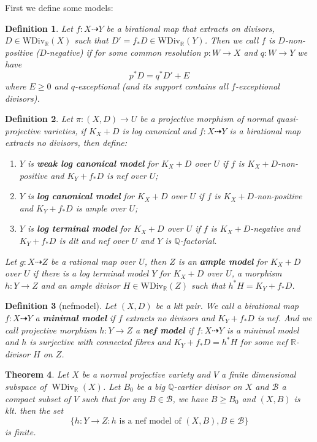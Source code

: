 \documentclass{article}
\newtheorem{defn}{Definition}[section]
\newtheorem{thm}[defn]{Theorem}
\begin{document}
First we define some models:
\begin{defn}
	Let $ f:X\dashrightarrow Y$ be a birational map that extracts on divisors, $ D\in \mathrm{WDiv}_\mathbb{R}(X) $ such that $ D'=f_*D\in \mathrm{WDiv}_\mathbb{R}(Y) $. Then we call $ f $ is $ D $-non-positive ($ D $-negative) if for some common resolution $ p:W\to X $ and $ q:W\to Y $ we have
	$$ p^*D=q^*D'+E $$
	where $ E\geqslant 0 $ and $ q $-exceptional (and its support contains all $ f $-exceptional divisors). 
\end{defn}

\begin{defn}
		Let $ \pi:(X,D)\to U $ be a projective morphism of normal quasi-projective varieties, if $ K_X+D $ is log canonical and $ f:X\dashrightarrow Y $ is a birational map extracts no divisors, then define:
		\begin{enumerate}
			\item $ Y $ is \textbf{ weak log canonical model} for $ K_X+D $ over $ U $ if $ f $ is $ K_X+D $-non-positive and $ K_Y+f_*D $ is nef over $ U $;
			\item $ Y $ is \textbf{ log canonical model} for $ K_X+D $ over $ U $ if $ f $ is $ K_X+D $-non-positive and $ K_Y+f_*D $ is ample over $ U $;
			\item $ Y $ is \textbf{ log terminal model} for $ K_X+D $ over $ U $ if $ f $ is $ K_X+D $-negative and $ K_Y+f_*D $ is dlt and nef over $ U $ and $ Y $ is $ \mathbb{Q} $-factorial.
		\end{enumerate}
	Let $ g:X\dashrightarrow Z $ be a rational map over $ U $, then $ Z $ is an \textbf{ample model } for $ K_X+D $ over $ U $ if there is a log terminal model $ Y $ for $ K_X+D $ over $ U $, a morphism $ h:Y\to Z $ and an ample divisor $ H\in \mathrm{WDiv}_\mathbb{R}(Z) $ such that $ h^*H=K_Y+f_*D $. 
\end{defn}

\begin{defn}[nefmodel]\label{nefmodel}
  Let $ (X,D) $ be a klt pair. We call a birational map $f:X\dashrightarrow Y $ a \textbf{minimal model} if $f$ extracts no divisors and $K_{Y}+f_*D$ is nef. And we call  projective morphism  $  h:Y\to Z $ a \textbf{nef model} if $ f:X\dashrightarrow Y $ is a minimal model and $ h $ is surjective with connected fibres and $ K_Y+f_*D=h^*H $ for some nef $ \mathbb{R} $-divisor $ H $ on $ Z $.
\end{defn}
\begin{thm}\label{finitenefmodel}
  Let $ X $ be a normal projective variety and $ V $ a finite dimensional subspace of $ \operatorname{WDiv}_\mathbb{R}(X) $. Let $ B_0 $ be a big $ \mathbb{Q}$-cartier divisor on $ X $ and $ \mathcal{B} $ a compact subset of $ V $ such that for any $ B\in \mathcal{B} $, we have $ B\geqslant B_0 $ and $ (X,B) $ is klt. then the set
  \[ \{h:Y\to Z:  h \text{ is a nef model of } (X,B), B\in\mathcal{B} \} \]
  is finite.
\end{thm}
\end{document}
